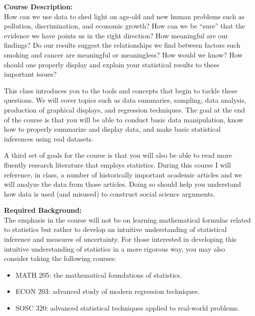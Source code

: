 \documentclass[11pt]{article}
\begin{document}
\vspace{1.5cm}
\large \textbf{Course Description:}\\[0.5em]
How can we use data to shed light on age-old and new human problems such as pollution, discrimination, and economic growth? How can we be “sure” that the evidence we have points us in the right direction? How meaningful are our findings? Do our results suggest the relationships we find between factors such smoking and cancer are meaningful or meaningless? How would we know? How should one properly display and explain your statistical results to these important issues?

This class introduces you to the tools and concepts that begin to tackle these questions. We will cover topics such as data summaries, sampling, data analysis, production of graphical displays, and regression techniques. The goal at the end of the course is that you will be able to conduct basic data manipulation, know how to properly summarize and display data, and make basic statistical inferences using real datasets.

A third set of goals for the course is that you will also be able to read more fluently research literature that employs statistics. During this course I will reference, in class, a number of historically important academic articles and we will analyze the data from those articles. Doing so should help you understand how data is used (and misused) to construct social science arguments.


\vspace{0.5cm}
\large \textbf{Required Background:}\\[0.5em]
The emphasis in the course will not be on learning mathematical formulas related to statistics but rather to develop an intuitive understanding of statistical inference and measures of uncertainty. For those interested in developing this intuitive understanding of statistics in a more rigorous way, you may also consider taking the following courses:
\begin{itemize}
    \item MATH 205: the mathematical foundations of statistics.
    \item ECON 203: advanced study of modern regression techniques.
    \item SOSC 320: advanced statistical techniques applied to real-world problems.
\end{itemize}
\end{document}
